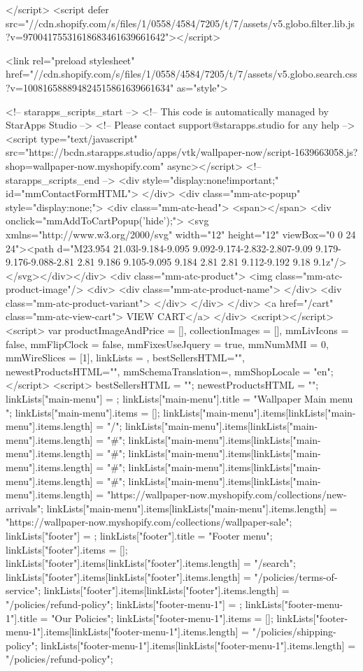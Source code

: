 {{{{{</script>
<script defer src="//cdn.shopify.com/s/files/1/0558/4584/7205/t/7/assets/v5.globo.filter.lib.js?v=97004175531618683461639661642"></script>

<link rel="preload stylesheet" href="//cdn.shopify.com/s/files/1/0558/4584/7205/t/7/assets/v5.globo.search.css?v=100816588894824515861639661634" as="style">




<!-- starapps_scripts_start -->
<!-- This code is automatically managed by StarApps Studio -->
<!-- Please contact support@starapps.studio for any help -->
<script type="text/javascript" src="https://bcdn.starapps.studio/apps/vtk/wallpaper-now/script-1639663058.js?shop=wallpaper-now.myshopify.com" async></script>
<!-- starapps_scripts_end -->
<div style="display:none!important;" id="mmContactFormHTML"> </div> <div class="mm-atc-popup" style="display:none;"> <div class="mm-atc-head"> <span></span> <div onclick="mmAddToCartPopup('hide');"> <svg xmlns="http://www.w3.org/2000/svg" width="12" height="12" viewBox="0 0 24 24"><path d="M23.954 21.03l-9.184-9.095 9.092-9.174-2.832-2.807-9.09 9.179-9.176-9.088-2.81 2.81 9.186 9.105-9.095 9.184 2.81 2.81 9.112-9.192 9.18 9.1z"/></svg></div></div> <div class="mm-atc-product"> <img class="mm-atc-product-image"/> <div> <div class="mm-atc-product-name"> </div> <div class="mm-atc-product-variant"> </div> </div> </div> <a href="/cart" class="mm-atc-view-cart"> VIEW CART</a> </div> <script></script> <script> var productImageAndPrice = [], collectionImages = [], mmLivIcons = false, mmFlipClock = false, mmFixesUseJquery = true, mmNumMMI = 0, mmWireSlices = [1], linkLists = {}, bestSellersHTML="", newestProductsHTML="", mmSchemaTranslation={}, mmShopLocale = "en"; </script> <script> bestSellersHTML = ""; newestProductsHTML = "";   linkLists["main-menu"] = {}; linkLists["main-menu"].title = "Wallpaper Main menu "; linkLists["main-menu"].items = [];  linkLists["main-menu"].items[linkLists["main-menu"].items.length] = "/";  linkLists["main-menu"].items[linkLists["main-menu"].items.length] = "#";  linkLists["main-menu"].items[linkLists["main-menu"].items.length] = "#";  linkLists["main-menu"].items[linkLists["main-menu"].items.length] = "#";  linkLists["main-menu"].items[linkLists["main-menu"].items.length] = "#";  linkLists["main-menu"].items[linkLists["main-menu"].items.length] = "https://wallpaper-now.myshopify.com/collections/new-arrivals";  linkLists["main-menu"].items[linkLists["main-menu"].items.length] = "https://wallpaper-now.myshopify.com/collections/wallpaper-sale";     linkLists["footer"] = {}; linkLists["footer"].title = "Footer menu"; linkLists["footer"].items = [];  linkLists["footer"].items[linkLists["footer"].items.length] = "/search";  linkLists["footer"].items[linkLists["footer"].items.length] = "/policies/terms-of-service";  linkLists["footer"].items[linkLists["footer"].items.length] = "/policies/refund-policy";     linkLists["footer-menu-1"] = {}; linkLists["footer-menu-1"].title = "Our Policies"; linkLists["footer-menu-1"].items = [];  linkLists["footer-menu-1"].items[linkLists["footer-menu-1"].items.length] = "/policies/shipping-policy";  linkLists["footer-menu-1"].items[linkLists["footer-menu-1"].items.length] = "/policies/refund-policy";  }}}}}
